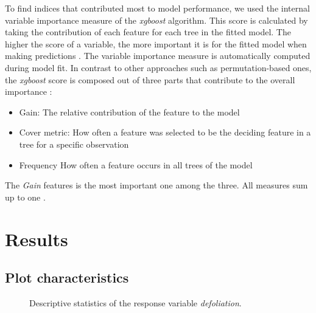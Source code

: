 \documentclass[review]{elsarticle}
\begin{document}
\noindent To find indices that contributed most to model performance, we used the internal variable importance measure of the \textit{xgboost} algorithm.
This score is calculated by taking the contribution of each feature for each tree in the fitted model.
The higher the score of a variable, the more important it is for the fitted model when making predictions \citep{chenXGBoostScalableTree2016}.
The variable importance measure is automatically computed during model fit.
In contrast to other approaches such as permutation-based ones, the \textit{xgboost} score is composed out of three parts that contribute to the overall importance \citep{chenXGBoostScalableTree2016}:

\begin{itemize}
	\item Gain: The relative contribution of the feature to the model
	\item Cover metric: How often a feature was selected to be the deciding feature in a tree for a specific observation
	\item Frequency How often a feature occurs in all trees of the model
\end{itemize}

\noindent The \textit{Gain} features is the most important one among the three.
All measures sum up to one \citep{chenXGBoostScalableTree2016}.


\section{Results}

\subsection{Plot characteristics}

\begin{figure} [t!]
	\begin{center}
		\caption{Descriptive statistics of the response variable \textit{defoliation}.}
		\label{fig:defol_boxplots}
	\end{center}
\end{figure}
\end{document}
